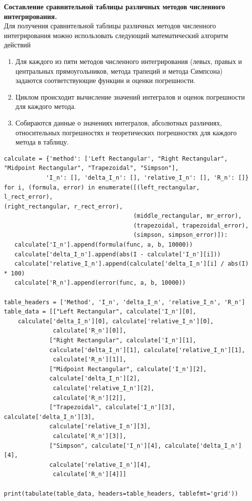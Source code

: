 \documentclass{article}
\begin{document}
\textbf{\large{Составление сравнительной таблицы различных методов численного интегрирования.}} \\

Для получения сравнительной таблицы различных методов численного интегрирования можно использовать следующий математический алгоритм действий

\begin{enumerate}
\item Для каждого из пяти методов численного интегрирования (левых, правых и центральных прямоугольников, метода трапеций и метода Симпсона) задаются соответствующие функции и оценки погрешности.
\item Циклом происходит вычисление значений интегралов и оценок погрешности для каждого метода.
\item Собираются данные о значениях интегралов, абсолютных различиях, относительных погрешностях и теоретических погрешностях для каждого метода в таблицу.

\end{enumerate}


\begin{lstlisting}
calculate = {'method': ['Left Rectangular', "Right Rectangular",
"Midpoint Rectangular", "Trapezoidal", "Simpson"],
            'I_n': [], 'delta_I_n': [], 'relative_I_n': [], 'R_n': []}
for i, (formula, error) in enumerate([(left_rectangular, l_rect_error), 
(right_rectangular, r_rect_error),
                                     (middle_rectangular, mr_error), 
                                     (trapezoidal, trapezoidal_error),
                                     (simpson, simpson_error)]):
   calculate['I_n'].append(formula(func, a, b, 10000))
   calculate['delta_I_n'].append(abs(I - calculate['I_n'][i]))
   calculate['relative_I_n'].append(calculate['delta_I_n'][i] / abs(I) * 100)
   calculate['R_n'].append(error(func, a, b, 10000))

table_headers = ['Method', 'I_n', 'delta_I_n', 'relative_I_n', 'R_n']
table_data = [["Left Rectangular", calculate['I_n'][0], 
    calculate['delta_I_n'][0], calculate['relative_I_n'][0],
              calculate['R_n'][0]],
             ["Right Rectangular", calculate['I_n'][1],
             calculate['delta_I_n'][1], calculate['relative_I_n'][1],
              calculate['R_n'][1]],
             ["Midpoint Rectangular", calculate['I_n'][2], 
             calculate['delta_I_n'][2],
              calculate['relative_I_n'][2],
              calculate['R_n'][2]],
             ["Trapezoidal", calculate['I_n'][3], calculate['delta_I_n'][3],
             calculate['relative_I_n'][3],
              calculate['R_n'][3]],
             ["Simpson", calculate['I_n'][4], calculate['delta_I_n'][4], 
             calculate['relative_I_n'][4],
              calculate['R_n'][4]]]

print(tabulate(table_data, headers=table_headers, tablefmt='grid'))

\end{lstlisting}
\end{document}
